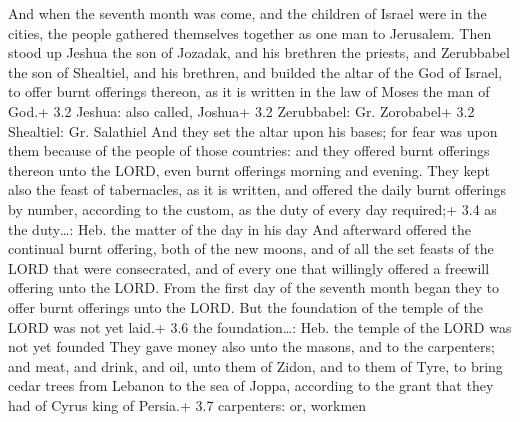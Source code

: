  And when the seventh month was come, and the children of
Israel were in the cities, the people gathered themselves together as
one man to Jerusalem.  Then stood up Jeshua the son of
Jozadak, and his brethren the priests, and Zerubbabel the son of
Shealtiel, and his brethren, and builded the altar of the God of Israel,
to offer burnt offerings thereon, as it is written in the law of Moses
the man of God.+ 3.2 Jeshua: also called, Joshua+ 3.2 Zerubbabel: Gr.
Zorobabel+ 3.2 Shealtiel: Gr. Salathiel  And they set the
altar upon his bases; for fear was upon them because of the people of
those countries: and they offered burnt offerings thereon unto the LORD,
even burnt offerings morning and evening.  They kept also
the feast of tabernacles, as it is written, and offered the daily burnt
offerings by number, according to the custom, as the duty of every day
required;+ 3.4 as the duty\ldots: Heb. the matter of the day in his day
 And afterward offered the continual burnt offering, both of
the new moons, and of all the set feasts of the LORD that were
consecrated, and of every one that willingly offered a freewill offering
unto the LORD.  From the first day of the seventh month
began they to offer burnt offerings unto the LORD. But the foundation of
the temple of the LORD was not yet laid.+ 3.6 the foundation\ldots: Heb.
the temple of the LORD was not yet founded  They gave money
also unto the masons, and to the carpenters; and meat, and drink, and
oil, unto them of Zidon, and to them of Tyre, to bring cedar trees from
Lebanon to the sea of Joppa, according to the grant that they had of
Cyrus king of Persia.+ 3.7 carpenters: or, workmen

